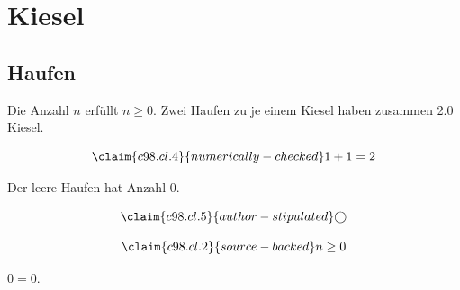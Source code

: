 \chapter{Kiesel}\label{c98}
\section{Haufen}\label{c98.s1}

\begin{theorem}[Anzahl]\label{c98.thm.count}
  Die Anzahl $n$ erfüllt $n \geq 0$.
  Zwei Haufen zu je einem Kiesel haben zusammen
  \num[c98.cl.4]{2.0}{} Kiesel.
\end{theorem}

\begin{equation}\label{c98.eq.sum}\claim{c98.cl.4}{numerically-checked}
  1 + 1 = 2
\end{equation}

\begin{lemma}[Leer]\label{c98.lem.empty}
  Der leere Haufen hat Anzahl $0$.
\end{lemma}

\begin{equation}\label{c98.eq.circle}\claim{c98.cl.5}{author-stipulated}
  \bigcirc
\end{equation}

\begin{vertiefung}[id=c98.v1, titel={T}, wozu={W}, voraussetzung={V}, zurueck={Z}]
  \begin{equation}\label{c98.eq.page}\claim{c98.cl.2}{source-backed}
    n \geq 0
  \end{equation}
\end{vertiefung}

\begin{corollary}
  $0 = 0$.
\end{corollary}
